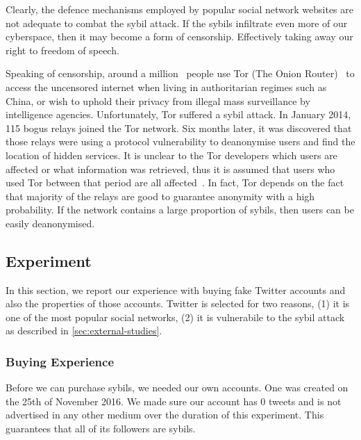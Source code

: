 Clearly, the defence mechanisms employed by popular social network websites are
not adequate to combat the sybil attack. If the sybils infiltrate even more of
our cyberspace, then it may become a form of censorship. Effectively taking away
our right to freedom of speech.

Speaking of censorship, around a million~\cite{tormetric} people use Tor (The
Onion Router)~\cite{dingledine2004tor} to access the uncensored internet when
living in authoritarian regimes such as China, or wish to uphold their privacy
from illegal mass surveillance by intelligence agencies. Unfortunately, Tor
suffered a sybil attack. In January 2014, 115 bogus relays joined the Tor
network. Six months later, it was discovered that those relays were using a
protocol vulnerability to deanonymise users and find the location of hidden
services. It is unclear to the Tor developers which users are affected or what
information was retrieved, thus it is assumed that users who used Tor between
that period are all affected~\cite{torsybil}. In fact, Tor depends on the fact
that majority of the relays are good to guarantee anonymity with a high
probability. If the network contains a large proportion of sybils, then users
can be easily deanonymised.

\subsection{Experiment}
In this section, we report our experience with buying fake Twitter accounts and
also the properties of those accounts. Twitter is selected for two reasons, (1)
it is one of the most popular social networks, (2) it is vulnerabile to the
sybil attack as described in \autoref{sec:external-studies}.


\subsubsection{Buying Experience}
Before we can purchase sybils, we needed our own accounts. One was created on
the 25th of November 2016. We made sure our account has 0 tweets and is not
advertised in any other medium over the duration of this experiment. This
guarantees that all of its followers are sybils.

